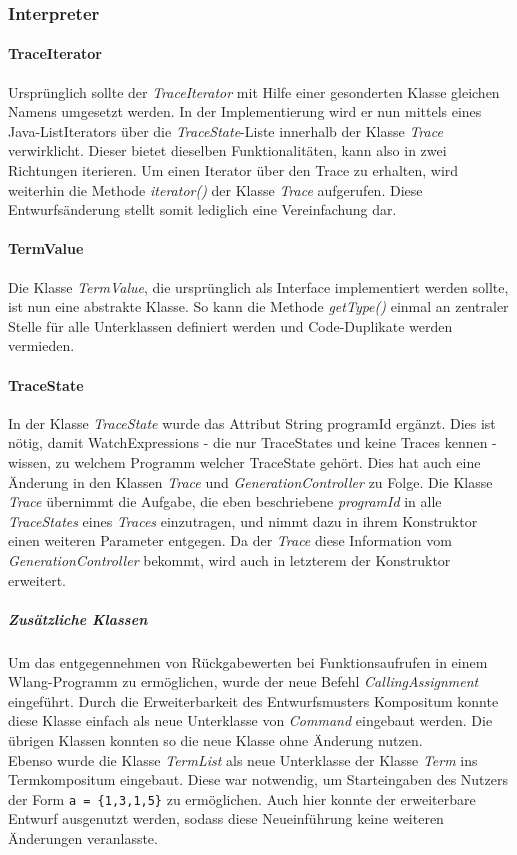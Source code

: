 \documentclass[parskip=full]{scrartcl}
\begin{document}
\subsubsection{Interpreter}
\paragraph{TraceIterator}
Ursprünglich sollte der \textit{TraceIterator} mit Hilfe einer gesonderten Klasse gleichen Namens umgesetzt werden. In der Implementierung wird er nun mittels eines Java-ListIterators über die \textit{TraceState}-Liste innerhalb der Klasse \textit{Trace} verwirklicht. Dieser bietet dieselben Funktionalitäten, kann also in zwei Richtungen iterieren. Um einen Iterator über den Trace zu erhalten, wird weiterhin die Methode \textit{iterator()} der Klasse \textit{Trace} aufgerufen. Diese Entwurfsänderung stellt somit lediglich eine Vereinfachung dar.
\paragraph{TermValue}
Die Klasse \textit{TermValue}, die ursprünglich als Interface implementiert werden sollte, ist nun eine abstrakte Klasse. So kann die Methode \textit{getType()} einmal an zentraler Stelle für alle Unterklassen definiert werden und Code-Duplikate werden vermieden.
\paragraph{TraceState}
In der Klasse \textit{TraceState} wurde das Attribut String programId ergänzt. Dies ist nötig, damit WatchExpressions - die nur TraceStates und keine Traces kennen - wissen, zu welchem Programm welcher TraceState gehört. Dies hat auch eine Änderung in den Klassen \textit{Trace} und \textit{GenerationController} zu Folge. Die Klasse \textit{Trace} übernimmt die Aufgabe, die eben beschriebene \textit{programId} in alle \textit{TraceStates} eines \textit{Traces} einzutragen, und nimmt dazu in ihrem Konstruktor einen weiteren Parameter entgegen. Da der \textit{Trace} diese Information vom  \textit{GenerationController} bekommt, wird auch in letzterem der Konstruktor erweitert.
\subparagraph{Zusätzliche Klassen}
Um das entgegennehmen von Rückgabewerten bei Funktionsaufrufen in einem Wlang-Programm zu ermöglichen, wurde der neue Befehl \textit{CallingAssignment} eingeführt. Durch die Erweiterbarkeit des Entwurfsmusters Kompositum konnte diese Klasse einfach als neue Unterklasse von \textit{Command} eingebaut werden. Die übrigen Klassen konnten so die neue Klasse ohne Änderung nutzen.\\
Ebenso wurde die Klasse \textit{TermList} als neue Unterklasse der Klasse \textit{Term} ins Termkompositum eingebaut. Diese war notwendig, um Starteingaben des Nutzers der Form \texttt{a = \{1,3,1,5\}} zu ermöglichen. Auch hier konnte der erweiterbare Entwurf ausgenutzt werden, sodass diese Neueinführung keine weiteren Änderungen veranlasste.
\end{document}
